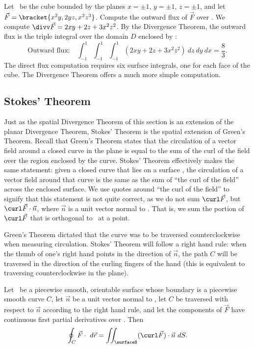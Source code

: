 \begin{example}\label{ex_divthm_space4}
Let \surfaceS\ be the cube bounded by the planes $x=\pm 1$, $y=\pm 1$, $z=\pm 1$, and let $\vec F =\bracket{x^2y,2yz,x^2z^3}$. Compute the outward flux of $\vec F$ over \surfaceS.
\solution
We compute $\divv \vec F = 2xy+2z+3x^2z^2$. By the Divergence Theorem, the outward flux is the triple integral over the domain $D$ enclosed by \surfaceS:
\[
\text{Outward flux:}
\quad \int_{-1}^1\int_{-1}^1\int_{-1}^1(2xy+2z+3x^2z^2)\ dz\ dy\ dx = \frac83.
\]
The direct flux computation requires six surface integrals, one for each face of the cube. The Divergence Theorem offers a much more simple computation.
\end{example}

\subsection{Stokes' Theorem}

Just as the spatial Divergence Theorem of this section is an extension of the planar Divergence Theorem, Stokes' Theorem is the spatial extension of Green's Theorem. Recall that Green's Theorem states that the circulation of a vector field around a closed curve in the plane is equal to the sum of the curl of the field over the region enclosed by the curve. Stokes' Theorem effectively makes the same statement: given a closed curve that lies on a surface \surfaceS, the circulation of a vector field around that curve is the same as the sum of ``the curl of the field'' across the enclosed surface. We use quotes around ``the curl of the field'' to signify that this statement is not quite correct, as we do not sum $\curl \vec F$, but $\curl \vec F\cdot\vec n$, where $\vec n$ is a unit vector normal to \surfaceS. That is, we sum the portion of $\curl \vec F$ that is orthogonal to \surfaceS\ at a point.

Green's Theorem dictated that the curve was to be traversed counterclockwise when measuring circulation. Stokes' Theorem will follow a right hand rule: when the thumb of one's right hand points in the direction of $\vec n$, the path $C$ will be traversed in the direction of the curling fingers of the hand (this is equivalent to traversing counterclockwise in the plane).

\begin{theorem}\label{thm:stokes_thm}
Let \surfaceS\ be a piecewise smooth, orientable surface whose boundary is a piecewise smooth curve $C$, let $\vec n$ be a unit vector normal to \surfaceS, let $C$ be traversed with respect to $\vec n$ according to the right hand rule, and let the components of $\vec F$ have continuous first partial derivatives over \surfaceS. Then
\[\oint_C \vec F\cdot \ d\vec r = \iint_\surfaceS (\curl\vec F)\cdot \vec n\ dS.\]
\end{theorem}

